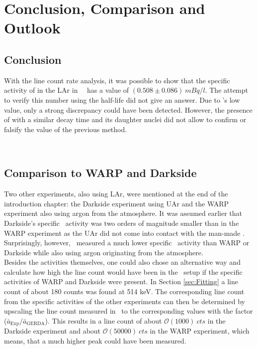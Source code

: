 \documentclass[encoding=utf8,british]{tumphthesis}
\begin{document}

\chapter{Conclusion, Comparison and Outlook}
\label{sec:ConcAndOutlook}
\section{Conclusion}

With the line count rate analysis, it was possible to show that the specific activity of  in the LAr in \gerda\ \PII\ has a value of $(0.508\pm0.086) ~\unit{mBq} / \unit{l}$.
The attempt to verify this number using the half-life did not give an answer.
Due to \Kr's low value, only a strong discrepancy could have been detected.
However, the presence of  with a similar decay time and its daughter nuclei  did not allow to confirm or falsify the value of the previous method.

\\
\section{Comparison to WARP and Darkside}

Two other experiments, also using LAr, were mentioned at the end of the introduction chapter: the Darkside experiment using UAr and the WARP experiment also using argon from the atmosphere.
It was assumed earlier that Darkside's specific \Kr\ activity was two orders of magnitude smaller than in the WARP experiment as the UAr did not come into contact with the man-made \Kr.
Surprisingly, however, \gerda\ measured a much lower specific \Kr\ activity than WARP or Darkside while also using argon originating from the atmosphere.
\\

Besides the activities themselves, one could also chose an alternative way and calculate how high the line count would have been in the \gerda\ setup if the specific activities of WARP and Darkside were present.
In Section \ref{sec:Fitting} a line count of about 180 counts was found at 514 keV.
The corresponding line count from the specific activities of the other experiments can then be determined by upscaling the line count measured in \gerda\ to the corresponding values with the factor ($\bar{a}_{\mathrm{Exp}}/\bar{a}_{\mathrm{GERDA}}$).
This results in a line count of about $\mathcal{O}(1000)~\unit{cts}$ in the Darkside experiment and about $\mathcal{O}(50000)~\unit{cts}$ in the WARP experiment, which means, that a much higher peak could have been measured.
\\
\end{document}
